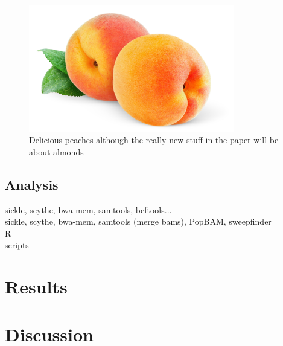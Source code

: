 \documentclass[12pt]{article}
\begin{document}

\begin{figure}[b]
\centering
   \includegraphics[width=0.8\textwidth]{peachzdfgad.jpg}
  \caption{Delicious peaches although the really new stuff in the paper will be about almonds}
  \label{fig:peach}
\end{figure}



\subsection*{Analysis}
sickle, scythe, bwa-mem, samtools, bcftools...\\
sickle, scythe, bwa-mem, samtools (merge bams), PopBAM, sweepfinder\\
R\\
scripts\\

\section*{Results}


\section*{Discussion}

\pagebreak


\pagebreak
\end{document}
